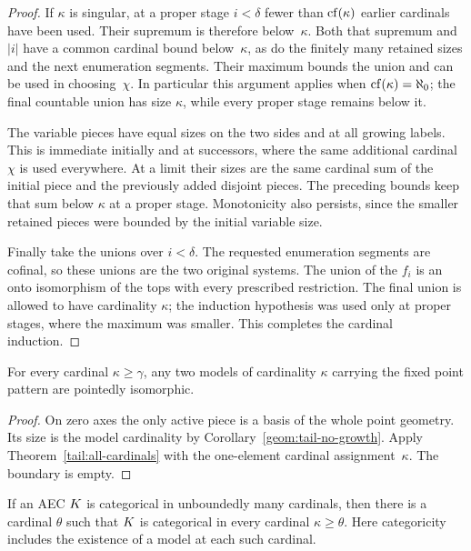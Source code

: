 \begin{proof}
If $\kappa$ is singular, at a proper stage $i<\delta$ fewer
than $\operatorname{cf}(\kappa)$ earlier cardinals have been used.  Their
supremum is therefore below~$\kappa$.  Both that supremum
and $|i|$ have a common cardinal bound below~$\kappa$, as do
the finitely many retained sizes and the next enumeration
segments.  Their maximum bounds the union and can be used
in choosing~$\chi$.  In particular this argument applies
when $\operatorname{cf}(\kappa)=\aleph_0$; the final countable union has
size $\kappa$, while every proper stage remains below it.

The variable pieces have equal sizes on the two sides and
at all growing labels.  This is immediate initially and at
successors, where the same additional cardinal $\chi$ is
used everywhere.  At a limit their sizes are the same
cardinal sum of the initial piece and the previously added
disjoint pieces.  The preceding bounds keep that sum below
$\kappa$ at a proper stage.  Monotonicity also persists,
since the smaller retained pieces were bounded by the
initial variable size.

Finally take the unions over $i<\delta$.  The requested
enumeration segments are cofinal, so these unions are the
two original systems.  The union of the $f_i$ is an onto
isomorphism of the tops with every prescribed restriction.
The final union is allowed to have cardinality $\kappa$;
the induction hypothesis was used only at proper stages,
where the maximum was smaller.  This completes the cardinal
induction.
\end{proof}

\begin{corollary}
\label{tail:pointed-categoricity}
For every cardinal $\kappa\geq\gamma$, any two models of
cardinality $\kappa$ carrying the fixed point pattern are
pointedly isomorphic.
\end{corollary}

\begin{proof}
On zero axes the only active piece is a basis of the whole
point geometry.  Its size is the model cardinality by
Corollary~\ref{geom:tail-no-growth}.  Apply
Theorem~\ref{tail:all-cardinals} with the one-element
cardinal assignment~$\kappa$.  The boundary is empty.
\end{proof}

\begin{theorem}
\label{tail:categoricity}
If an AEC $K$ is categorical in unboundedly many cardinals,
then there is a cardinal $\theta$ such that $K$ is
categorical in every cardinal $\kappa\geq\theta$.
Here categoricity includes the existence of a model at
each such cardinal.
\end{theorem}

